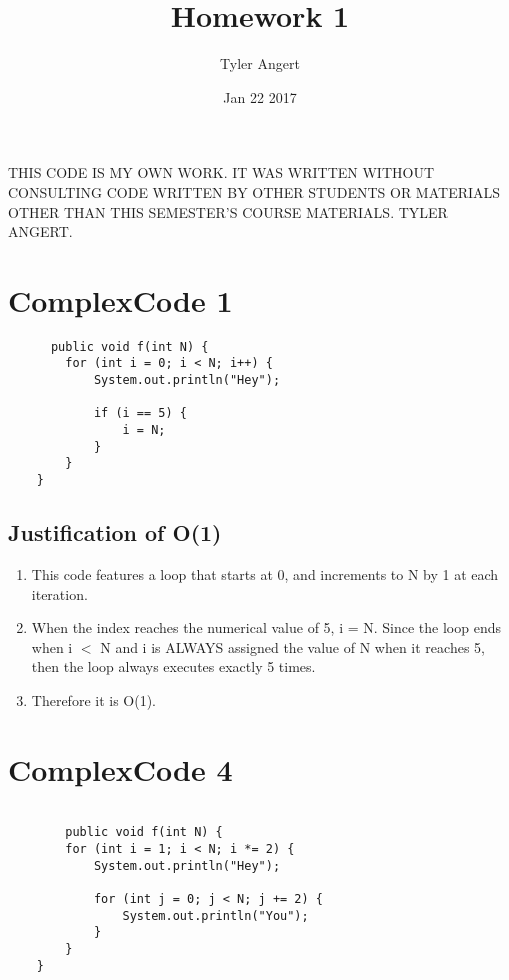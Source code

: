 \documentclass[11pt]{article}
\title{Homework 1}
\author{Tyler Angert}
\date{Jan 22 2017}
\begin{document}
\maketitle

\begin{center}
THIS CODE IS MY OWN WORK. IT WAS WRITTEN WITHOUT CONSULTING CODE WRITTEN BY OTHER
STUDENTS OR MATERIALS OTHER THAN THIS SEMESTER'S COURSE MATERIALS. TYLER ANGERT.
\end{center}

\section{ComplexCode 1}
  \begin{lstlisting}
      public void f(int N) {
  		for (int i = 0; i < N; i++) {
  			System.out.println("Hey");

  			if (i == 5) {
  				i = N;
  			}	
  		}
  	}
  \end{lstlisting}

  \subsection{Justification of O(1)}
    \begin{enumerate}
      \item This code features a loop that starts at 0, and increments to N by 1 at each iteration.
      \item When the index reaches the numerical value of 5, i = N. Since the loop ends when i  $<$ N and i is ALWAYS assigned the value of N when it reaches 5, then the loop always executes exactly 5 times.
      \item Therefore it is O(1).
    \end{enumerate}

\section{ComplexCode 4}
  \begin{lstlisting}
    
        public void f(int N) {
  		for (int i = 1; i < N; i *= 2) {
  			System.out.println("Hey");
  			
  			for (int j = 0; j < N; j += 2) {
  				System.out.println("You");
  			}
  		}
  	}
  \end{lstlisting}
\end{document}

